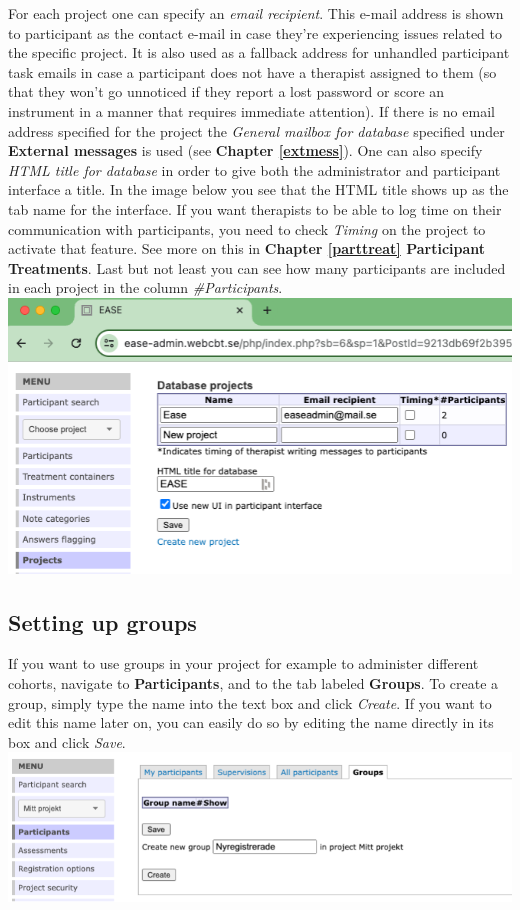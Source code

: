 \documentclass[
]{book}
\begin{document}
For each project one can specify an \emph{email recipient}. This e-mail address is shown to participant as the contact e-mail in case they're experiencing issues related to the specific project. It is also used as a fallback address for unhandled participant task emails in case a participant does not have a therapist assigned to them (so that they won't go unnoticed if they report a lost password or score an instrument in a manner that requires immediate attention). If there is no email address specified for the project the \emph{General mailbox for database} specified under \textbf{External messages} is used (see \textbf{Chapter \ref{extmess}}).
One can also specify \emph{HTML title for database} in order to give both the administrator and participant interface a title. In the image below you see that the HTML title shows up as the tab name for the interface.
If you want therapists to be able to log time on their communication with participants, you need to check \emph{Timing} on the project to activate that feature. See more on this in \textbf{Chapter \ref{parttreat} Participant Treatments}.
Last but not least you can see how many participants are included in each project in the column \emph{\#Participants}.
\includegraphics{images/projects.png}

\subsection{Setting up groups}\label{setting-up-groups}

If you want to use groups in your project for example to administer different cohorts, navigate to \textbf{Participants}, and to the tab labeled \textbf{Groups}. To create a group, simply type the name into the text box and click \emph{Create}. If you want to edit this name later on, you can easily do so by editing the name directly in its box and click \emph{Save}.
\includegraphics{images/groups.png}
\end{document}

